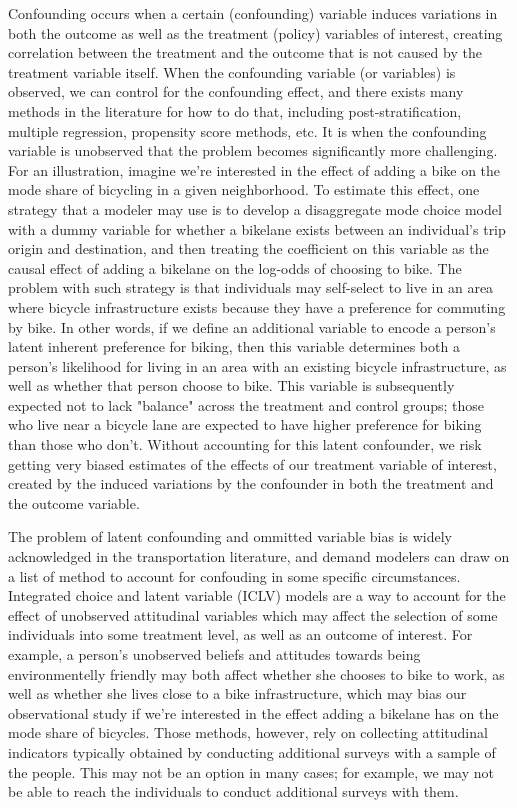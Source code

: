 Confounding occurs when a certain (confounding) variable induces variations in
both the outcome as well as the treatment (policy) variables of interest,
creating correlation between the treatment and the outcome that is not caused
by the treatment variable itself. When the confounding variable (or variables) is
observed, we can control for the confounding effect, and there exists many
methods in the literature for how to do that, including post-stratification,
multiple regression, propensity score methods, etc. It is when the
confounding variable is unobserved that the problem becomes significantly
more challenging.
For an illustration, imagine we're interested in the effect of adding a bike on the mode share of bicycling in a given neighborhood.
To estimate this effect, one strategy that a modeler may use is to develop a disaggregate mode choice model with a dummy variable for whether a bikelane exists between an individual's trip origin and destination, and then treating the coefficient on this variable as the causal effect of adding a bikelane on the log-odds of choosing to bike.
The problem with such strategy is that individuals may self-select to live in an area where bicycle infrastructure exists because they have a preference for commuting by bike.
In other words, if we define an additional variable to encode a person's latent inherent preference for biking, then this variable determines both a person's likelihood for living in an area with an existing bicycle infrastructure, as well as whether that person choose to bike.
This variable is subsequently expected not to lack "balance" across the treatment and control groups; those who live near a bicycle lane are expected to have higher preference for biking than those who don't.
Without accounting for this latent confounder, we risk getting very biased estimates
of the effects of our treatment variable of interest, created by the
induced variations by the confounder in both the treatment and the outcome
variable.



The problem of latent confounding and ommitted variable bias is widely
acknowledged in the transportation literature, and demand modelers can draw on
a list of method to account for confouding in some specific circumstances.
Integrated choice and latent variable (ICLV) models are a way to account for
the effect of unobserved attitudinal variables which may affect the selection
of some individuals into some treatment level, as well as an outcome of
interest. For example, a person's unobserved beliefs and attitudes towards
being environmentelly friendly may both affect whether she chooses to bike to
work, as well as whether she lives close to a bike infrastructure, which may
bias our observational study if we're interested in the effect adding a
bikelane has on the mode share of bicycles. Those methods, however, rely on
collecting attitudinal indicators typically obtained by conducting
additional surveys with a sample of the people. This may not be an option in
many cases; for example, we may not be able to reach the individuals to conduct additional surveys with them.


